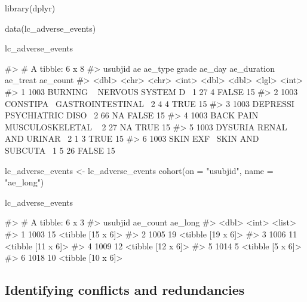 \begin{Schunk}
\begin{Sinput}
library(dplyr)

data(lc_adverse_events)

lc_adverse_events %>% head()
\end{Sinput}
\begin{Soutput}
#> # A tibble: 6 x 8
#>   usubjid ae        ae_type           grade ae_day ae_duration ae_treat ae_count
#>     <dbl> <chr>     <chr>             <int>  <dbl>       <dbl> <lgl>       <int>
#> 1    1003 BURNING ~ NERVOUS SYSTEM D~     1     27           4 FALSE          15
#> 2    1003 CONSTIPA~ GASTROINTESTINAL~     2      4           4 TRUE           15
#> 3    1003 DEPRESSI~ PSYCHIATRIC DISO~     2     66          NA FALSE          15
#> 4    1003 BACK PAIN MUSCULOSKELETAL ~     2     27          NA TRUE           15
#> 5    1003 DYSURIA   RENAL AND URINAR~     2      1           3 TRUE           15
#> 6    1003 SKIN EXF~ SKIN AND SUBCUTA~     1      5          26 FALSE          15
\end{Soutput}
\begin{Sinput}
lc_adverse_events <- lc_adverse_events %>%
  cohort(on = "usubjid", name = "ae_long")

lc_adverse_events %>% head()
\end{Sinput}
\begin{Soutput}
#> # A tibble: 6 x 3
#>   usubjid ae_count ae_long          
#>     <dbl>    <int> <list>           
#> 1    1003       15 <tibble [15 x 6]>
#> 2    1005       19 <tibble [19 x 6]>
#> 3    1006       11 <tibble [11 x 6]>
#> 4    1009       12 <tibble [12 x 6]>
#> 5    1014        5 <tibble [5 x 6]> 
#> 6    1018       10 <tibble [10 x 6]>
\end{Soutput}
\end{Schunk}

\hypertarget{identifying-conflicts-and-redundancies}{%
\subsection{Identifying conflicts and
redundancies}\label{identifying-conflicts-and-redundancies}}

